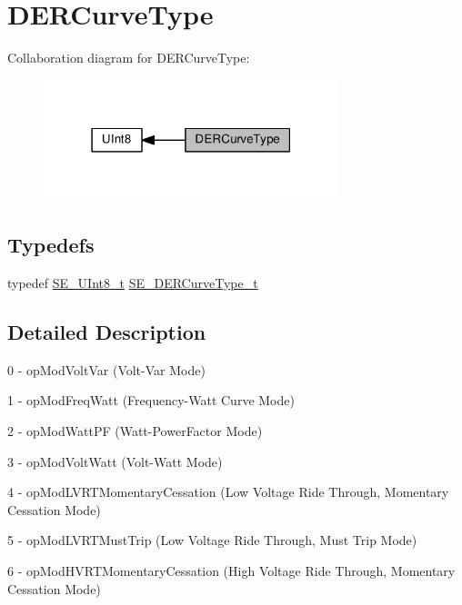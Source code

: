 \hypertarget{group__DERCurveType}{}\section{D\+E\+R\+Curve\+Type}
\label{group__DERCurveType}
Collaboration diagram for D\+E\+R\+Curve\+Type\+:\nopagebreak
\begin{figure}[H]
\begin{center}
\leavevmode
\includegraphics[width=243pt]{group__DERCurveType}
\end{center}
\end{figure}
\subsection*{Typedefs}
\begin{DoxyCompactItemize}
\item 
typedef \hyperlink{group__UInt8_gaf7c365a1acfe204e3a67c16ed44572f5}{S\+E\+\_\+\+U\+Int8\+\_\+t} \hyperlink{group__DERCurveType_gad16d5a3d1a31b3f09dc59e04101c0d8e}{S\+E\+\_\+\+D\+E\+R\+Curve\+Type\+\_\+t}
\end{DoxyCompactItemize}


\subsection{Detailed Description}
0 -\/ op\+Mod\+Volt\+Var (Volt-\/\+Var Mode)

1 -\/ op\+Mod\+Freq\+Watt (Frequency-\/\+Watt Curve Mode)

2 -\/ op\+Mod\+Watt\+PF (Watt-\/\+Power\+Factor Mode)

3 -\/ op\+Mod\+Volt\+Watt (Volt-\/\+Watt Mode)

4 -\/ op\+Mod\+L\+V\+R\+T\+Momentary\+Cessation (Low Voltage Ride Through, Momentary Cessation Mode)

5 -\/ op\+Mod\+L\+V\+R\+T\+Must\+Trip (Low Voltage Ride Through, Must Trip Mode)

6 -\/ op\+Mod\+H\+V\+R\+T\+Momentary\+Cessation (High Voltage Ride Through, Momentary Cessation Mode)

